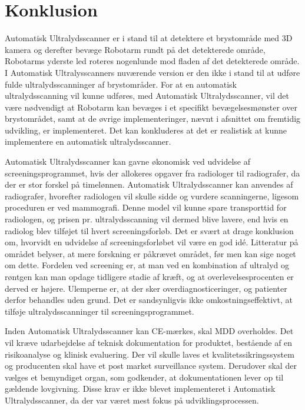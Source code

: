 \chapter{Konklusion}\label{kapitel_Konklusion}
Automatisk Ultralydsscanner er i stand til at detektere et brystområde med 3D kamera og derefter bevæge Robotarm rundt på det detekterede område, Robotarms yderste led roteres nogenlunde mod fladen af det detekterede område. I Automatisk Ultralysscanners nuværende version er den ikke i stand til at udføre fulde ultralydsscanninger af brystområder. For at en automatisk ultralydsscanning vil kunne udføres, med Automatisk Ultralydsscanner, vil det være nødvendigt at Robotarm kan bevæges i et specifikt bevægelsesmønster over brystområdet, samt at de øvrige implementeringer, nævnt i afsnittet om fremtidig udvikling, er implementeret. Det kan konkluderes at det er realistisk at kunne implementere en automatisk ultralydsscanner. 

Automatisk Ultralydsscanner kan gavne økonomisk ved udvidelse af screeningsprogrammet, hvis der allokeres opgaver fra radiologer til radiografer, da der er stor forskel på timelønnen. Automatisk Ultralydsscanner kan anvendes af radiografer, hvorefter radiologen vil skulle sidde og vurdere scanningerne, ligesom proceduren er ved mammografi. Denne model vil kunne spare transporttid for radiologen, og prisen pr. ultralydsscanning vil dermed blive lavere, end hvis en radiolog blev tilføjet til hvert screeningsforløb. Det er svært at drage konklusion om, hvorvidt en udvidelse af screeningsforløbet vil være en god idé. Litteratur på området belyser, at mere forskning er påkrævet området, før men kan sige noget om dette. Fordelen ved screening er, at man ved en kombination af ultralyd og røntgen kan man opdage tidligere stadie af kræft, og at overlevelsesprocenten er derved er højere. Ulemperne er, at der sker overdiagnosticeringer, og patienter derfor behandles uden grund.  Det er sandsynligvis ikke omkostningseffektivt, at tilføje ultralydsscanninger til screeningsprogrammet. 

Inden Automatisk Ultralydsscanner kan CE-mærkes, skal MDD overholdes. Det vil kræve udarbejdelse af teknisk dokumentation for produktet, bestående af en risikoanalyse og klinisk evaluering. Der vil skulle laves et kvalitetssikringssystem og producenten skal have et post market surveillance system. Derudover skal der vælges et bemyndiget organ, som godkender, at dokumentationen lever op til gældende lovgivning. Disse krav er ikke blevet implementeret i Automatisk Ultralydsscanner, da der var været mest fokus på udviklingsprocessen. 
